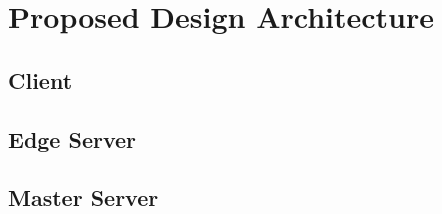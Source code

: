 \section{Proposed Design Architecture}
\label{sec:Solution}

\subsection{Client}


\subsection{Edge Server}


\subsection{Master Server}
